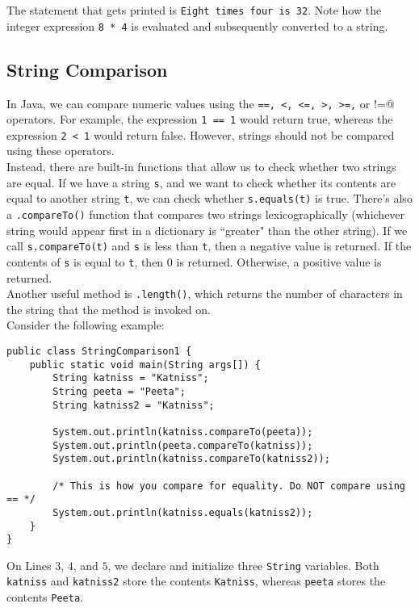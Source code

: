 The statement that gets printed is \verb!Eight times four is 32!. Note how the integer expression \verb!8 * 4! is evaluated and subsequently converted to a string. 


\subsection{String Comparison}

In Java, we can compare numeric values using the \verb!==, <, <=, >, >=,! or \verb@!=@ operators. For example, the expression \verb!1 == 1! would return true, whereas the expression \verb!2 < 1! would return false. However, strings should not be compared using these operators. \\

Instead, there are built-in functions that allow us to check whether two strings are equal. If we have a string \verb!s!, and we want to check whether its contents are equal to another string \verb!t!, we can check whether \verb!s.equals(t)! is true. There's also a \verb!.compareTo()! function that compares two strings lexicographically (whichever string would appear first in a dictionary is ``greater" than the other string). If we call \verb!s.compareTo(t)! and \verb!s! is less than \verb!t!, then a negative value is returned. If the contents of \verb!s! is equal to \verb!t!, then $0$ is returned. Otherwise, a positive value is returned. \\


Another useful method is \verb!.length()!, which returns the number of characters in the string that the method is invoked on. \\

Consider the following example:

\begin{lstlisting}
public class StringComparison1 {
    public static void main(String args[]) {
        String katniss = "Katniss";
        String peeta = "Peeta";
        String katniss2 = "Katniss";
        
        System.out.println(katniss.compareTo(peeta));
        System.out.println(peeta.compareTo(katniss));
        System.out.println(katniss.compareTo(katniss2));
        
        /* This is how you compare for equality. Do NOT compare using == */
        System.out.println(katniss.equals(katniss2));
    }
}
\end{lstlisting}

On Lines $3$, $4$, and $5$, we declare and initialize three \verb!String! variables. Both \verb!katniss! and \verb!katniss2! store the contents \verb!Katniss!, whereas \verb!peeta! stores the contents \verb!Peeta!. \\

